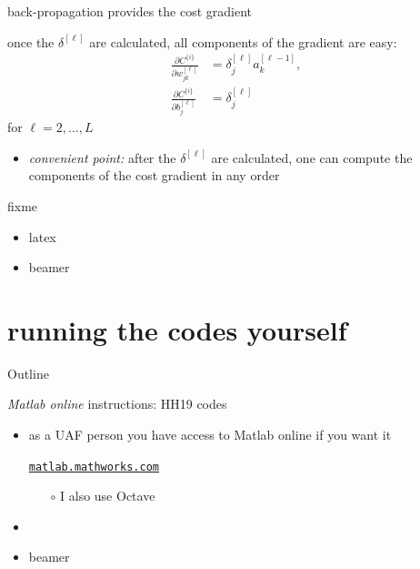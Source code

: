 \documentclass[xcolor={svgnames},
               hyperref={colorlinks,citecolor=DeepPink4,linkcolor=FireBrick,urlcolor=Maroon}]
               {beamer}
\begin{document}
\begin{frame}{back-propagation provides the cost gradient}

\begin{corollary}
once the $\delta^{[\ell]}$ are calculated, all components of the gradient are easy:
\begin{align*}
\frac{\partial C^{\{i\}}}{\partial w_{jk}^{[\ell]}} &= \delta_j^{[\ell]} a_k^{[\ell-1]}, \\
\frac{\partial C^{\{i\}}}{\partial b_{j}^{[\ell]}} &= \delta_j^{[\ell]}
\end{align*}
for $\ell = 2,\dots,L$
\end{corollary}

\bigskip
\begin{itemize}
\item \emph{convenient point:}  after the $\delta^{[\ell]}$ are calculated, one can compute the components of the cost gradient in any order
\end{itemize}
\end{frame}

\begin{frame}{fixme}

\begin{itemize}
\item latex
\item beamer
\end{itemize}
\end{frame}


\section{running the codes yourself}

\begin{frame}{Outline}
\end{frame}


\begin{frame}{\emph{Matlab online} instructions: HH19 codes}

\begin{itemize}
\item as a UAF person you have access to Matlab online if you want it

\begin{center}
\href{https://matlab.mathworks.com/}{\texttt{matlab.mathworks.com}}
\end{center}

    \begin{itemize}
    \item[$\circ$] I also use Octave
    \end{itemize}
\item 
\item beamer
\end{itemize}
\end{frame}
\end{document}
